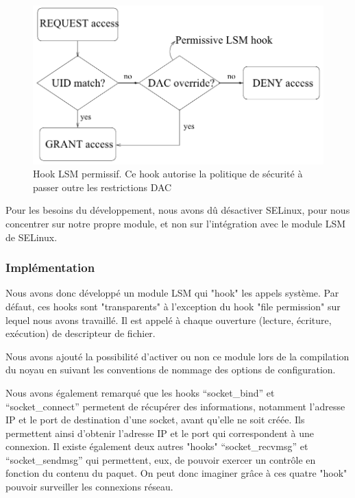 \documentclass[pdftex,a4paper,titlepage,11pt,openright]{article}
\begin{document}
\begin{figure}%
	\centering
	\includegraphics[scale=0.45]{attachements/lsm2.png}
	\caption{Hook LSM permissif. Ce hook autorise la politique de sécurité à passer outre les restrictions DAC \cite{LSMINTRO}}
\end{figure}

Pour les besoins du développement, nous avons dû désactiver SELinux, pour nous concentrer sur notre propre module, et non sur l'intégration avec le module LSM de SELinux.

\subsubsection{Implémentation}

Nous avons donc développé un module LSM qui "hook" les appels système. Par défaut, ces hooks sont "transparents" à l'exception du hook "file permission" sur lequel nous avons travaillé. Il est appelé à chaque ouverture (lecture, écriture, exécution) de descripteur de fichier.

Nous avons ajouté la possibilité d'activer ou non ce module lors de la compilation du noyau en suivant les conventions de nommage des options de configuration.

Nous avons également remarqué que les hooks ``socket\_bind'' et ``socket\_connect'' permetent de récupérer des informations, notamment l'adresse IP et le port de destination d'une socket, avant qu'elle ne soit créée. Ils permettent ainsi d'obtenir l'adresse IP et le port qui correspondent à une connexion. Il existe également deux autres "hooks" ``socket\_recvmsg'' et ``socket\_sendmsg'' qui permettent, eux, de pouvoir exercer un contrôle en fonction du contenu du paquet. On peut donc imaginer grâce à ces quatre "hook" pouvoir surveiller les connexions réseau.
\end{document}
